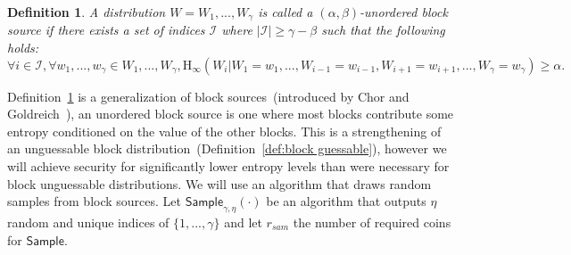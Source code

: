 \documentclass[11pt]{article}
\newcommand{\defref}[1]{\mbox{Definition~\ref{#1}}}
\newcommand{\class}[1]{{\ensuremath{\mathsf{#1}}}}
\newcommand{\sample}{\ensuremath{\class{Sample}}\xspace}
\newcommand{\Hoo}{\mathrm{H}_\infty}
\newtheorem{definition}[theorem]{Definition}
\begin{document}
\begin{definition}
\label{def:unordered source}
A distribution $W = W_1,..., W_\gamma$ is called a $(\alpha, \beta)$-unordered block source if there exists a set of indices $\mathcal{I}$ where $|\mathcal{I}| \geq \gamma - \beta$ such that the following holds:
\[
\forall i\in \mathcal{I}, \forall w_1,..., w_\gamma \in W_1,..., W_\gamma, \Hoo(W_i | W_1 = w_1,..., W_{i-1}=w_{i-1}, W_{i+1}=w_{i+1},..., W_\gamma = w_\gamma) \geq \alpha.
\]
\end{definition}

\defref{def:unordered source} is a generalization of block sources~(introduced by Chor and Goldreich~\cite{DBLP:journals/siamcomp/ChorG88}), an unordered block source is one where most blocks contribute some entropy conditioned on the value of the other blocks.  This is a strengthening of an unguessable block distribution~(\defref{def:block guessable}), however we will achieve security for significantly lower entropy levels than were necessary for block unguessable distributions.  We will use an algorithm that draws random samples from block sources.  Let $\sample_{\gamma, \eta}(\cdot)$ be an algorithm that outputs $\eta$ random and unique indices of $\{1,..., \gamma\}$ and let $r_{sam}$ the number of required coins for $\sample$.
\end{document}
